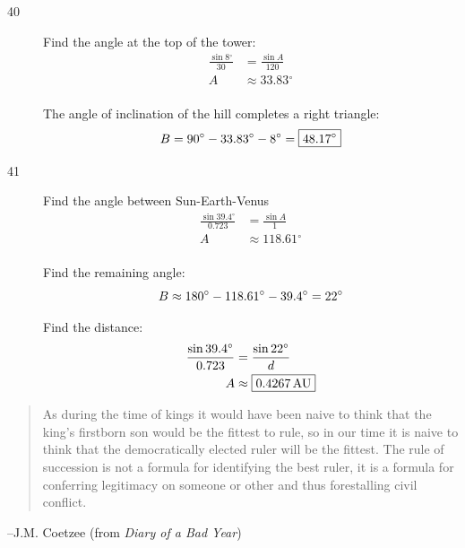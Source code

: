 \documentclass{exam}
\newcommand{\dg}{\ensuremath{^\circ}}
\begin{document}
\begin{description}
      \item[40] 
        Find the angle at the top of the tower:
        \begin{align*}
          \frac{\sin 8 \dg}{30} & = \frac{\sin A}{120} \\
          A                     & \approx 33.83 \dg \\
        \end{align*}

        The angle of inclination of the hill completes a right triangle:
        \[
          B = 90 \dg - 33.83 \dg - 8 \dg = \boxed{ 48.17 \dg } \\
        \]

      \item[41] 
        Find the angle between Sun-Earth-Venus
        \begin{align*}
          \frac{\sin 39.4 \dg}{0.723} & = \frac{\sin A}{1} \\
          A                     & \approx 118.61 \dg \\
        \end{align*}

        Find the remaining angle:
        \[
          B \approx 180 \dg - 118.61 \dg - 39.4 \dg = 22 \dg \\
        \]

        Find the distance:
        \begin{align*}
          \frac{\sin 39.4 \dg}{0.723} & = \frac{\sin 22 \dg}{d} \\
          A                     & \approx \boxed{ \unit[0.4267]{AU} } \\
        \end{align*}

    \end{description}

  \else
    \vspace{1 cm}
    \begin{quote}
      \begin{em}
        As during the time of kings it would have been naive to think that the king's firstborn son would be the fittest to
        rule, so in our time it is naive to think that the democratically elected ruler will be the fittest. The rule of
        succession is not a formula for identifying the best ruler, it is a formula for conferring legitimacy on someone or
        other and thus forestalling civil conflict.
      \end{em}
    \end{quote}
    \hspace{1.5 cm} --J.M. Coetzee (from {\em Diary of a Bad Year})
  \fi
\end{document}
